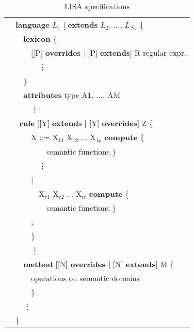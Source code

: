 \documentclass[preprint, prX]{revtex4}
\begin{document}
\begin{table}[htb]           \caption{LISA specifications}
\label{tab:tab30}
\vspace{-5mm}
\footnotesize
\begin{center}
\begin{tabular}{ | l | }
\hline
\ \ {\bf language } $L_{1}$ $[$ {\bf extends} $L_{2}$, ..., $L_{N}$$]$ \{\\
\ \ \ \ {\bf lexicon} \{\\
\ \ \ \ \ \ $[[$P$]$ {\bf overrides} $|$ $[$P$]$ {\bf extends}$]$ R regular expr.\\
\ \ \ \ \ \ \ \ \vdots\\
\ \ \ \ \}\\
\ \ \ \ {\bf attributes} type A1, ..., AM\\
\ \ \ \ \ \ \vdots\\
\ \ \ {\bf rule} $[[$Y$]$ {\bf extends} $|$ $[$Y$]$ {\bf overrides}$]$ Z \{\\
\ \ \ \ \ \ X ::= X$_{11}$ X$_{12}$ ... X$_{1p}$ {\bf compute} \{\\
\ \ \ \ \ \ \ \ \ \ semantic functions \}\\
\ \ \ \ \ \ \ \ \vdots\\
\ \ \ \ \ \ $|$\\
\ \ \ \ \ \ \ \ X$_{r1}$ X$_{r2}$ ... X$_{rt}$ {\bf compute} \{\\
\ \ \ \ \ \ \ \ \ \ semantic functions \} \\
\ \ \ \ \ \ ;\\
\ \ \ \ \ \ \}\\
\ \ \ \ \ \ \vdots\\
\ \ \ \ {\bf method} $[[$N$]$ {\bf overrides} $|$ $[$N$]$ {\bf extends}$]$ M \{\\
\ \ \ \ \ \ operations on semantic domains\\
\ \ \ \ \ \ \}\\
\ \ \ \ \vdots\\
\ \ \} \\
\hline
\end{tabular}
\end{center}
\normalsize
\vspace{-5mm}
\end{table}
\end{document}
